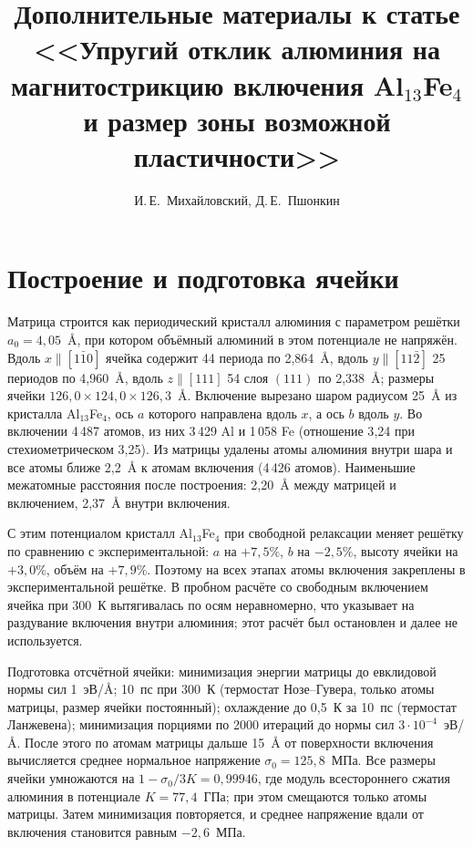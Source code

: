 \documentclass[11pt,a4paper]{article}
\title{Дополнительные материалы к статье <<Упругий отклик алюминия на магнитострикцию включения Al$_{13}$Fe$_4$
и размер зоны возможной пластичности>>}
\author{И.\,Е.~Михайловский, Д.\,Е.~Пшонкин}
\date{}
\begin{document}
\maketitle

\section{Построение и подготовка ячейки}

Матрица строится как периодический кристалл алюминия с параметром решётки
$a_0=4{,}05$~\AA{}, при котором объёмный алюминий в этом потенциале
не напряжён. Вдоль $x\parallel[1\bar10]$ ячейка содержит 44 периода
по 2{,}864~\AA{}, вдоль $y\parallel[11\bar2]$ 25 периодов по 4{,}960~\AA{},
вдоль $z\parallel[111]$ 54 слоя $(111)$ по 2{,}338~\AA{}; размеры ячейки
$126{,}0\times124{,}0\times126{,}3$~\AA{}. Включение вырезано шаром радиусом
25~\AA{} из кристалла Al$_{13}$Fe$_4$, ось $a$ которого направлена вдоль $x$,
а ось $b$ вдоль $y$. Во включении 4\,487 атомов, из них 3\,429 Al и 1\,058 Fe
(отношение 3{,}24 при стехиометрическом 3{,}25). Из матрицы удалены атомы
алюминия внутри шара и все атомы ближе 2{,}2~\AA{} к атомам включения
(4\,426 атомов). Наименьшие межатомные расстояния после построения:
2{,}20~\AA{} между матрицей и включением, 2{,}37~\AA{} внутри включения.

С этим потенциалом кристалл Al$_{13}$Fe$_4$ при свободной релаксации
меняет решётку по сравнению с экспериментальной: $a$ на $+7{,}5\%$,
$b$ на $-2{,}5\%$, высоту ячейки на $+3{,}0\%$, объём на $+7{,}9\%$.
Поэтому на всех этапах атомы включения закреплены в экспериментальной
решётке. В пробном расчёте со свободным включением ячейка при 300~К
вытягивалась по осям неравномерно, что указывает на раздувание включения
внутри алюминия; этот расчёт был остановлен и далее не используется.

Подготовка отсчётной ячейки: минимизация энергии матрицы до евклидовой нормы
сил 1~эВ/\AA{}; 10~пс при 300~К (термостат Нозе--Гувера, только атомы
матрицы, размер ячейки постоянный); охлаждение до 0{,}5~К за 10~пс
(термостат Ланжевена); минимизация порциями по 2000 итераций до нормы сил
$3\cdot10^{-4}$~эВ/\AA{}. После этого по атомам матрицы дальше 15~\AA{}
от поверхности включения вычисляется среднее нормальное напряжение
$\sigma_0=125{,}8$~МПа. Все размеры ячейки умножаются на
$1-\sigma_0/3K=0{,}99946$, где модуль всестороннего сжатия алюминия
в потенциале $K=77{,}4$~ГПа; при этом смещаются только атомы матрицы.
Затем минимизация повторяется, и среднее напряжение вдали от включения
становится равным $-2{,}6$~МПа.
\end{document}
